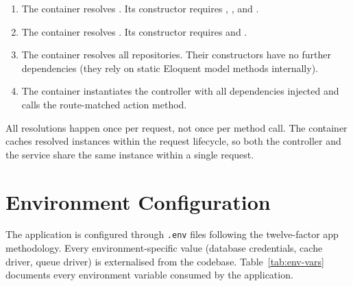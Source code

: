 \begin{enumerate}
  \item The container resolves .
    Its constructor requires ,
    , and .
  \item The container resolves . Its
    constructor requires  and
    .
  \item The container resolves all repositories. Their constructors
    have no further dependencies (they rely on static Eloquent model
    methods internally).
  \item The container instantiates the controller with all dependencies
    injected and calls the route-matched action method.
\end{enumerate}

All resolutions happen once per request, not once per method call. The
container caches resolved instances within the request lifecycle, so
both the controller and the service share the same
 instance within a single request.

\section{Environment Configuration}
\label{sec:environment}

The application is configured through \texttt{.env} files following
the twelve-factor app methodology. Every environment-specific value
(database credentials, cache driver, queue driver) is externalised from
the codebase. Table~\ref{tab:env-vars} documents every
environment variable consumed by the application.

